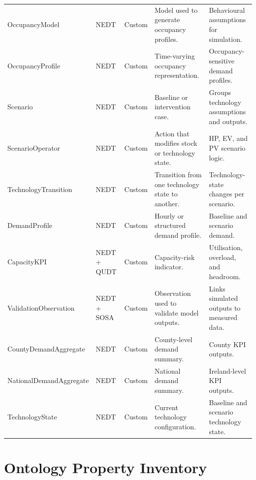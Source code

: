 \documentclass[preprint,12pt]{elsarticle}
\begin{document}
\begin{longtable}{P{2.7cm} P{2cm} P{2.2cm} P{4cm} P{3.4cm}}
OccupancyModel & NEDT & Custom &
  Model used to generate occupancy profiles. &
  Behavioural assumptions for simulation. \\
OccupancyProfile & NEDT & Custom &
  Time-varying occupancy representation. &
  Occupancy-sensitive demand profiles. \\
Scenario & NEDT & Custom &
  Baseline or intervention case. &
  Groups technology assumptions and outputs. \\
ScenarioOperator & NEDT & Custom &
  Action that modifies stock or technology state. &
  HP, EV, and PV scenario logic. \\
TechnologyTransition & NEDT & Custom &
  Transition from one technology state to another. &
  Technology-state changes per scenario. \\
DemandProfile & NEDT & Custom &
  Hourly or structured demand profile. &
  Baseline and scenario demand. \\
CapacityKPI & NEDT + QUDT & Custom &
  Capacity-risk indicator. &
  Utilisation, overload, and headroom. \\
ValidationObservation & NEDT + SOSA & Custom &
  Observation used to validate model outputs. &
  Links simulated outputs to measured data. \\
CountyDemandAggregate & NEDT & Custom &
  County-level demand summary. &
  County KPI outputs. \\
NationalDemandAggregate & NEDT & Custom &
  National demand summary. &
  Ireland-level KPI outputs. \\
TechnologyState & NEDT & Custom &
  Current technology configuration. &
  Baseline and scenario technology state. \\

\end{longtable}


\section{Ontology Property Inventory}
\label{app:property-inventory}
\end{document}
